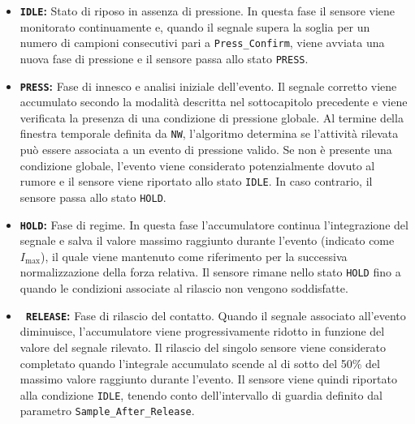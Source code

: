 \documentclass[10pt, a4paper]{article}
\begin{document}
                    \begin{itemize}

                        \item \textbf{\texttt{IDLE}:} Stato di riposo in assenza di pressione. In questa fase il sensore viene monitorato continuamente e, quando il segnale supera la soglia 
                        per un numero di campioni consecutivi pari a \texttt{Press\_Confirm}, viene avviata una nuova fase di pressione e il sensore passa allo stato \texttt{PRESS}.

                        \item \textbf{\texttt{PRESS}:} Fase di innesco e analisi iniziale dell'evento. Il segnale corretto viene accumulato secondo la modalità descritta nel sottocapitolo precedente 
                        e viene verificata la presenza di una condizione di pressione globale. Al termine della finestra temporale definita da \texttt{NW}, l'algoritmo determina se l'attività rilevata 
                        può essere associata a un evento di pressione valido. Se non è presente una condizione globale, l'evento viene considerato potenzialmente dovuto al rumore e il sensore viene riportato 
                        allo stato \texttt{IDLE}. In caso contrario, il sensore passa allo stato \texttt{HOLD}.

                        \item \textbf{\texttt{HOLD}:} Fase di regime. In questa fase l'accumulatore continua l'integrazione del segnale e salva il 
                        valore massimo raggiunto durante l'evento (indicato come $I_{\mathrm{max}}$), il quale viene mantenuto come riferimento per la successiva normalizzazione della forza relativa. Il sensore rimane nello stato \texttt{HOLD} fino a 
                        quando le condizioni associate al rilascio non vengono soddisfatte.

                        \item \textbf{\texttt{ RELEASE}:} Fase di rilascio del contatto. Quando il segnale associato all'evento diminuisce, l'accumulatore viene progressivamente ridotto in funzione 
                        del valore del segnale rilevato. Il rilascio del singolo sensore viene considerato completato quando l'integrale accumulato scende al di sotto del 50\% del massimo valore 
                        raggiunto durante l'evento. Il sensore viene quindi riportato alla condizione \texttt{IDLE}, tenendo conto dell'intervallo di guardia definito dal parametro \texttt{Sample\_After\_Release}.

                    \end{itemize}
\end{document}
